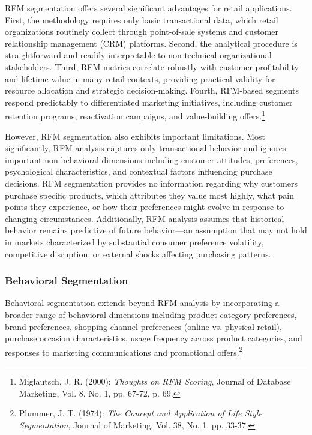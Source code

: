 \documentclass[12pt,a4paper,oneside]{report}
\begin{document}
RFM segmentation offers several significant advantages for retail applications. First, the methodology requires only basic transactional data, which retail organizations routinely collect through point-of-sale systems and customer relationship management (CRM) platforms. Second, the analytical procedure is straightforward and readily interpretable to non-technical organizational stakeholders. Third, RFM metrics correlate robustly with customer profitability and lifetime value in many retail contexts, providing practical validity for resource allocation and strategic decision-making. Fourth, RFM-based segments respond predictably to differentiated marketing initiatives, including customer retention programs, reactivation campaigns, and value-building offers.\footnote{Miglautsch, J. R. (2000): \textit{Thoughts on RFM Scoring}, Journal of Database Marketing, Vol. 8, No. 1, pp. 67-72, p. 69.}

However, RFM segmentation also exhibits important limitations. Most significantly, RFM analysis captures only transactional behavior and ignores important non-behavioral dimensions including customer attitudes, preferences, psychological characteristics, and contextual factors influencing purchase decisions. RFM segmentation provides no information regarding why customers purchase specific products, which attributes they value most highly, what pain points they experience, or how their preferences might evolve in response to changing circumstances. Additionally, RFM analysis assumes that historical behavior remains predictive of future behavior—an assumption that may not hold in markets characterized by substantial consumer preference volatility, competitive disruption, or external shocks affecting purchasing patterns.

\subsubsection{Behavioral Segmentation}

Behavioral segmentation extends beyond RFM analysis by incorporating a broader range of behavioral dimensions including product category preferences, brand preferences, shopping channel preferences (online vs. physical retail), purchase occasion characteristics, usage frequency across product categories, and responses to marketing communications and promotional offers.\footnote{Plummer, J. T. (1974): \textit{The Concept and Application of Life Style Segmentation}, Journal of Marketing, Vol. 38, No. 1, pp. 33-37.}
\end{document}
